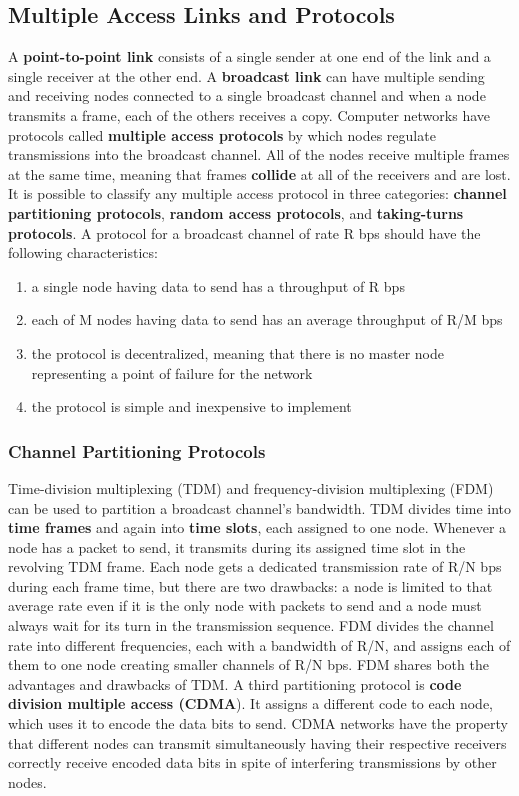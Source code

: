 \documentclass{article}
\begin{document}
\subsection{Multiple Access Links and Protocols}
A \textbf{point-to-point link} consists of a single sender at one end of the link and a single receiver at the other end.
A \textbf{broadcast link} can have multiple sending and receiving nodes connected to a single broadcast channel and when a node transmits a frame, each of the others receives a copy.
Computer networks have protocols called \textbf{multiple access protocols} by which nodes regulate transmissions into the broadcast channel.
All of the nodes receive multiple frames at the same time, meaning that frames \textbf{collide} at all of the receivers and are lost.
It is possible to classify any multiple access protocol in three categories: \textbf{channel partitioning protocols}, \textbf{random access protocols}, and \textbf{taking-turns protocols}.
A protocol for a broadcast channel of rate R bps should have the following characteristics: 
\begin{enumerate}
    \item a single node having data to send has a throughput of R bps
    \item each of M nodes having data to send has an average throughput of R/M bps
    \item the protocol is decentralized, meaning that there is no master node representing a point of failure for the network 
    \item the protocol is simple and inexpensive to implement
\end{enumerate}
\subsubsection{Channel Partitioning Protocols}
Time-division multiplexing (TDM) and frequency-division multiplexing (FDM) can be used to partition a broadcast channel’s bandwidth. TDM divides time into \textbf{time frames} and again into \textbf{time slots}, each assigned to one node. Whenever a node has a packet to send, it transmits during its assigned time slot in the revolving TDM frame. Each node gets a dedicated transmission rate of R/N bps during each frame time, but there are two drawbacks: a node is limited to that average rate even if it is the only node with packets to send and a node must always wait for its turn in the transmission sequence. FDM divides the channel rate into different frequencies, each with a bandwidth of R/N, and assigns each of them to one node creating smaller channels of R/N bps. FDM shares both the advantages and drawbacks of TDM. A third partitioning protocol is \textbf{code division multiple access (CDMA}). It assigns a different code to each node, which uses it to encode the data bits to send. CDMA networks have the property that different nodes can transmit simultaneously having their respective receivers correctly receive encoded data bits in spite of interfering transmissions by other nodes.
\end{document}

